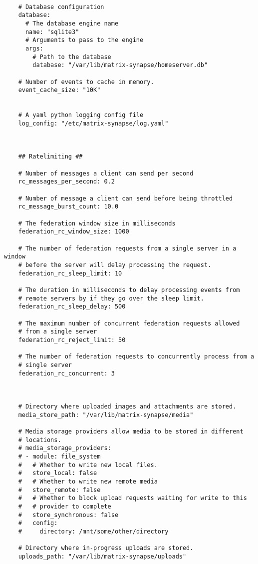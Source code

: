 \begin{lstlisting}
    
    # Database configuration
    database:
      # The database engine name
      name: "sqlite3"
      # Arguments to pass to the engine
      args:
        # Path to the database
        database: "/var/lib/matrix-synapse/homeserver.db"
    
    # Number of events to cache in memory.
    event_cache_size: "10K"
    
    
    # A yaml python logging config file
    log_config: "/etc/matrix-synapse/log.yaml"
    
    
    
    ## Ratelimiting ##
    
    # Number of messages a client can send per second
    rc_messages_per_second: 0.2
    
    # Number of message a client can send before being throttled
    rc_message_burst_count: 10.0
    
    # The federation window size in milliseconds
    federation_rc_window_size: 1000
    
    # The number of federation requests from a single server in a window
    # before the server will delay processing the request.
    federation_rc_sleep_limit: 10
    
    # The duration in milliseconds to delay processing events from
    # remote servers by if they go over the sleep limit.
    federation_rc_sleep_delay: 500
    
    # The maximum number of concurrent federation requests allowed
    # from a single server
    federation_rc_reject_limit: 50
    
    # The number of federation requests to concurrently process from a
    # single server
    federation_rc_concurrent: 3
    
    
    
    # Directory where uploaded images and attachments are stored.
    media_store_path: "/var/lib/matrix-synapse/media"
    
    # Media storage providers allow media to be stored in different
    # locations.
    # media_storage_providers:
    # - module: file_system
    #   # Whether to write new local files.
    #   store_local: false
    #   # Whether to write new remote media
    #   store_remote: false
    #   # Whether to block upload requests waiting for write to this
    #   # provider to complete
    #   store_synchronous: false
    #   config:
    #     directory: /mnt/some/other/directory
    
    # Directory where in-progress uploads are stored.
    uploads_path: "/var/lib/matrix-synapse/uploads"
    

\end{lstlisting}
